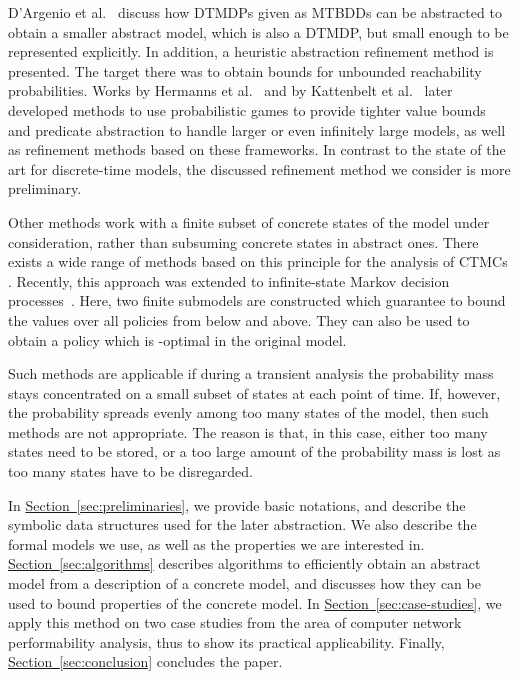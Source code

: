\documentclass[10pt,twocolumn]{article}
\newcommand{\refsec}[1]{\texorpdfstring{\hyperref[sec:#1]{Section~\ref*{sec:#1}}}{Section~\ref*{sec:#1}}}
\begin{document}
D'Argenio et al.~\cite{DArgenioJJL01} discuss how DTMDPs given as
MTBDDs can be abstracted to obtain a smaller abstract model, which is
also a DTMDP, but small enough to be represented explicitly. In
addition, a heuristic abstraction refinement method is presented. The
target there was to obtain bounds for unbounded reachability
probabilities. Works by Hermanns et al.~\cite{HermannsWZ08} and by
Kattenbelt et al.~\cite{KattenbeltKNP10} later developed methods to
use probabilistic games to provide tighter value bounds and predicate
abstraction to handle larger or even infinitely large models, as well
as refinement methods based on these frameworks. In contrast to the
state of the art for discrete-time models, the discussed refinement
method we consider is more preliminary.

Other methods work with a finite subset of concrete states of the
model under consideration, rather than subsuming concrete states in
abstract ones. There exists a wide range of methods based on this principle
for the analysis of CTMCs \cite{Grassmann91,MoorselS94,MunskyK06,HenzingerMW09}.
Recently, this approach was extended to infinite-state Markov decision processes~\cite{Buchholz12}.
Here, two finite submodels are constructed which guarantee to bound the
values over all policies from below and above. They can also be used
to obtain a policy which is -optimal in the original model.

Such methods are applicable if during a transient analysis the
probability mass stays concentrated on a small subset of states at
each point of time.  If, however, the probability spreads evenly among
too many states of the model, then such methods are not appropriate. The
reason is that, in this case, either too many states need to be stored, 
or a too large amount of the probability mass is lost as too many
states have to be disregarded.

In \refsec{preliminaries}, we
provide basic notations, and describe the symbolic data structures used
for the later abstraction. We also describe the formal models we use,
as well as the properties we are interested in. \refsec{algorithms}
describes algorithms to efficiently obtain an abstract model from a
description of a concrete model, and discusses how they can be used to
bound properties of the concrete model. In \refsec{case-studies}, we
apply this method on two case studies from the area of computer network
performability analysis, thus to show its practical applicability. Finally,
\refsec{conclusion} concludes the paper.
\end{document}
